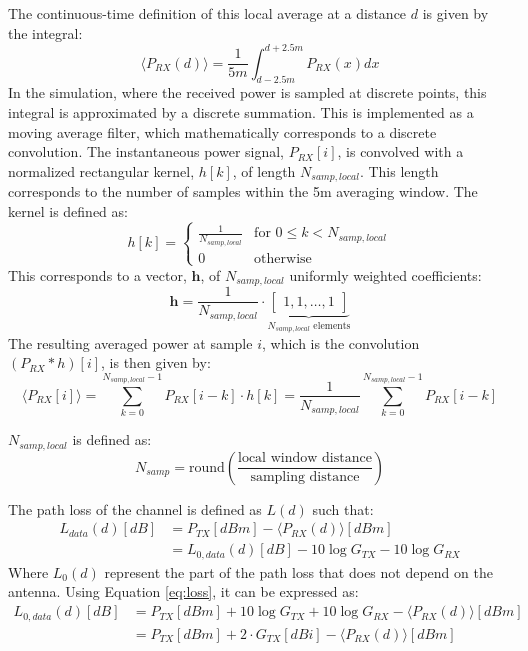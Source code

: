 The continuous-time definition of this local average at a distance $d$ is given by the integral:
\begin{equation}
	\langle P_{RX}(d) \rangle = \frac{1}{5m} \int_{d-2.5m}^{d+2.5m} P_{RX}(x) dx
\end{equation}
In the simulation, where the received power is sampled at discrete points, this integral is approximated by a discrete summation. This is implemented as a moving average filter, which mathematically corresponds to a discrete convolution. The instantaneous power signal, $P_{RX}[i]$, is convolved with a normalized rectangular kernel, $h[k]$, of length $N_{samp, local}$. This length corresponds to the number of samples within the 5m averaging window. The kernel is defined as:
\begin{equation}
	h[k] = 
	\begin{cases} 
		\frac{1}{N_{samp, local}} & \text{for } 0 \le k < N_{samp, local} \\ 
		0 & \text{otherwise} 
	\end{cases}
\end{equation}
This corresponds to a vector, $\mathbf{h}$, of $N_{samp, local}$ uniformly weighted coefficients:
\begin{equation}
	\mathbf{h} = \frac{1}{N_{samp, local}} \cdot
	\underbrace{\begin{bmatrix}
			{1, 1, \dots, 1}
	\end{bmatrix}}_{N_{samp, local} \text{ elements}}
\end{equation}
The resulting averaged power at sample $i$, which is the convolution $(P_{RX} * h)[i]$, is then given by:
\begin{equation}
	\langle P_{RX}[i] \rangle = \sum_{k=0}^{N_{samp, local}-1} P_{RX}[i-k] \cdot h[k] = \frac{1}{N_{samp, local}} \sum_{k=0}^{N_{samp, local}-1} P_{RX}[i-k]
\end{equation}

$N_{samp, local}$ is defined as:
\begin{equation}
	N_{samp} = \text{round}\left(\frac{\text{local window distance}}{\text{sampling distance}}\right)
\end{equation}






The path loss of the channel is defined as $L(d)$ such that:
\begin{align}
	\label{eq:loss}
	L_{data}(d) [dB] &= P_{TX} [dBm] - \langle P_{RX}(d) \rangle [dBm]\\
			  &= L_{0, data}(d) [dB] - 10 \log G_{TX} - 10 \log G_{RX} \label{eq:loss-3}
\end{align}
Where $L_0(d)$ represent the part of the path loss that does not depend on the antenna. Using Equation \eqref{eq:loss}, it can be expressed as:
\begin{align}
	L_{0, data}(d) [dB] &=  P_{TX} [dBm] + 10 \log G_{TX} + 10 \log G_{RX} - \langle P_{RX}(d) \rangle [dBm]
	\label{eq:loss-2}\\
				&= P_{TX} [dBm] + 2 \cdot G_{TX} [dBi] - \langle P_{RX}(d) \rangle [dBm]
\end{align}

